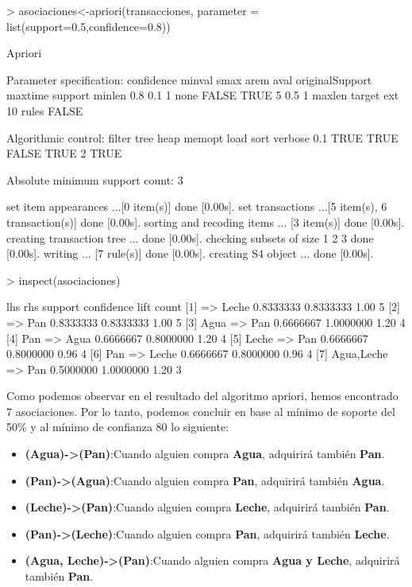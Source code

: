 \documentclass [a4paper] {article}
\begin{document}
\begin{Schunk}
\begin{Sinput}
> asociaciones<-apriori(transacciones, parameter = list(support=0.5,confidence=0.8))
\end{Sinput}
\begin{Soutput}
Apriori

Parameter specification:
 confidence minval smax arem  aval originalSupport maxtime support minlen
        0.8    0.1    1 none FALSE            TRUE       5     0.5      1
 maxlen target   ext
     10  rules FALSE

Algorithmic control:
 filter tree heap memopt load sort verbose
    0.1 TRUE TRUE  FALSE TRUE    2    TRUE

Absolute minimum support count: 3 

set item appearances ...[0 item(s)] done [0.00s].
set transactions ...[5 item(s), 6 transaction(s)] done [0.00s].
sorting and recoding items ... [3 item(s)] done [0.00s].
creating transaction tree ... done [0.00s].
checking subsets of size 1 2 3 done [0.00s].
writing ... [7 rule(s)] done [0.00s].
creating S4 object  ... done [0.00s].
\end{Soutput}
\begin{Sinput}
> inspect(asociaciones)
\end{Sinput}
\begin{Soutput}
    lhs             rhs     support   confidence lift count
[1] {}           => {Leche} 0.8333333 0.8333333  1.00 5    
[2] {}           => {Pan}   0.8333333 0.8333333  1.00 5    
[3] {Agua}       => {Pan}   0.6666667 1.0000000  1.20 4    
[4] {Pan}        => {Agua}  0.6666667 0.8000000  1.20 4    
[5] {Leche}      => {Pan}   0.6666667 0.8000000  0.96 4    
[6] {Pan}        => {Leche} 0.6666667 0.8000000  0.96 4    
[7] {Agua,Leche} => {Pan}   0.5000000 1.0000000  1.20 3    
\end{Soutput}
\end{Schunk}

Como podemos observar en el resultado del algoritmo apriori, hemos encontrado 7 asociaciones.
Por lo tanto, podemos concluir en base al mínimo de soporte del 50\% y al mínimo de confianza 80%
lo siguiente:

\begin{itemize}
\item \textbf{(Agua)->(Pan)}:Cuando alguien compra \textbf{Agua},
                                adquirirá también \textbf{Pan}.
\item \textbf{(Pan)->(Agua)}:Cuando alguien compra \textbf{Pan},
                                adquirirá también \textbf{Agua}.
\item \textbf{(Leche)->(Pan)}:Cuando alguien compra \textbf{Leche},
                                adquirirá también \textbf{Pan}.
\item \textbf{(Pan)->(Leche)}:Cuando alguien compra \textbf{Pan},
                                adquirirá también \textbf{Leche}.
\item \textbf{(Agua, Leche)->(Pan)}:Cuando alguien compra \textbf{Agua y Leche},
                                adquirirá también \textbf{Pan}.
\end{itemize}
\end{document}
